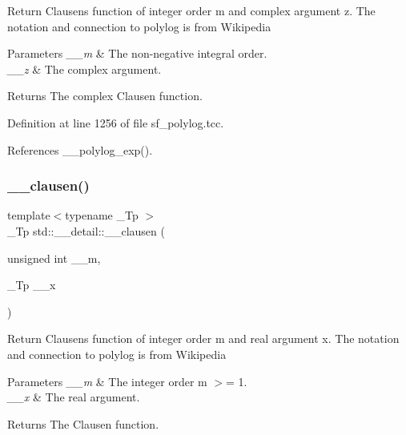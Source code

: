 Return Clausen\textquotesingle{}s function of integer order m and complex argument {\ttfamily z}. The notation and connection to polylog is from Wikipedia


\begin{DoxyParams}{Parameters}
{\em \+\_\+\+\_\+m} & The non-\/negative integral order. \\
\hline
{\em \+\_\+\+\_\+z} & The complex argument. \\
\hline
\end{DoxyParams}
\begin{DoxyReturn}{Returns}
The complex Clausen function. 
\end{DoxyReturn}


Definition at line 1256 of file sf\+\_\+polylog.\+tcc.



References \+\_\+\+\_\+polylog\+\_\+exp().

\mbox{\label{namespacestd_1_1____detail_a07d0f6b515fec03e423e5cecbb7580cd}} 
\subsubsection{\texorpdfstring{\+\_\+\+\_\+clausen()}{\_\_clausen()}\hspace{0.1cm}{\footnotesize\ttfamily [2/2]}}
{\footnotesize\ttfamily template$<$typename \+\_\+\+Tp $>$ \\
\+\_\+\+Tp std\+::\+\_\+\+\_\+detail\+::\+\_\+\+\_\+clausen (\begin{DoxyParamCaption}\item[{unsigned int}]{\+\_\+\+\_\+m,  }\item[{\+\_\+\+Tp}]{\+\_\+\+\_\+x }\end{DoxyParamCaption})}

Return Clausen\textquotesingle{}s function of integer order m and real argument x. The notation and connection to polylog is from Wikipedia


\begin{DoxyParams}{Parameters}
{\em \+\_\+\+\_\+m} & The integer order m $>$= 1. \\
\hline
{\em \+\_\+\+\_\+x} & The real argument. \\
\hline
\end{DoxyParams}
\begin{DoxyReturn}{Returns}
The Clausen function. 
\end{DoxyReturn}


